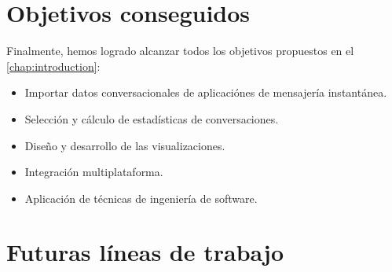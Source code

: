 \begin{comment}
The relevant idea behind the estimator developed in Section \ref{reamining_time_at_anytime} is that it can be understood as a system that corrects the estimations provided by another system. This could be an easy to implement solution for improving the accuracy of the estimations made by more complex systems just by setting it prior to them.

The main limitation for implementing the proposed online estimator is the bottleneck produced by the \acrshort{crtm} \acrshort{api} server, which would not be able to handle all the needed requests for sampling all the bus stops at the same time. Nevertheless, the computational cost of each of the used models was calculated in case that the processing capacity requirements were to be consider for a future implementation.

In general, the developed methods in this Project are built in a way that allows the usability for other similar use cases. The hyperparameters of the estimators are chosen based on the data and the available input features, so they can be easily adapted for different system behaviors.
\end{comment}

\section{Objetivos conseguidos}
\label{sec:achieved-goals}

Finalmente, hemos logrado alcanzar todos los objetivos propuestos en el \autoref{chap:introduction}:

\begin{itemize}
	
	\item Importar datos conversacionales de aplicaciónes de mensajería instantánea.
	\item Selección y cálculo de estadísticas de conversaciones.
	\item Diseño y desarrollo de las visualizaciones.
	\item Integración multiplataforma.
	\item Aplicación de técnicas de ingeniería de software.
	
\end{itemize}

\section{Futuras líneas de trabajo}
\label{sec:future-work}

